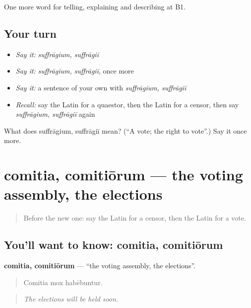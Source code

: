 \begin{grammarlens}[title={What you've built}]
One more word for telling, explaining and describing at B1.
\end{grammarlens}

\subsection*{Your turn}
\begin{itemize}
\raggedright
  \item \emph{Say it:} \emph{suffrāgium, suffrāgiī}
  \item \emph{Say it:} \emph{suffrāgium, suffrāgiī}, once more
  \item \emph{Say it:} a sentence of your own with \emph{suffrāgium, suffrāgiī}
  \item \emph{Recall:} say the Latin for a quaestor, then the Latin for a censor, then say \emph{suffrāgium, suffrāgiī} again
\end{itemize}

\begin{tcolorbox}[breakable,colback=teal!4,colframe=teal!35!black,title={Before you move on}]
What does suffrāgium, suffrāgiī mean? (\textquotedblleft{}A vote; the right to vote\textquotedblright{}.) Say it once more.
\end{tcolorbox}
\section[comitia, comitiōrum]{comitia, comitiōrum — the voting assembly, the elections}

\label{lesson:LA-C384-comitia}



\begin{quote}
Before the new one: say the Latin for a censor, then the Latin for a vote.
\end{quote}

\subsection*{You'll want to know: comitia, comitiōrum}
\textbf{comitia, comitiōrum} — \textquotedblleft{}the voting assembly, the elections\textquotedblright{}.

\begin{quote}
Comitia mox habēbuntur.
\end{quote}

\begin{quote}
\emph{The elections will be held soon.}
\end{quote}


